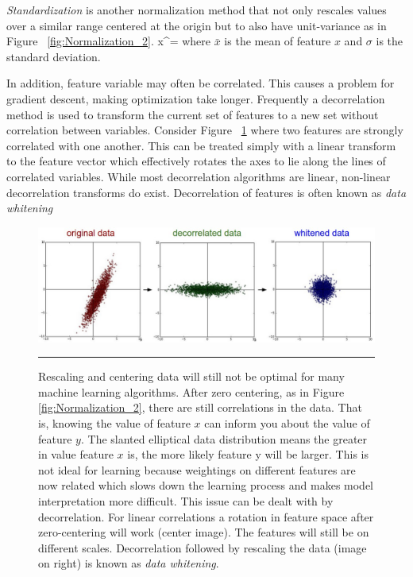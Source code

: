 \textit{Standardization} is another normalization method that not only rescales values over a similar range centered at the origin but to also have unit-variance as in Figure ~\ref{fig:Normalization_2}.
\be
x^\prime = 
\ee
where $\bar{x}$ is the mean of feature $x$ and $\sigma$ is the standard deviation.

In addition, feature variable may often be correlated.
This causes a problem for gradient descent, making optimization take longer\citep{featureScaling}.
Frequently a decorrelation method is used to transform the current set of features to a new set without correlation between variables.
Consider Figure ~\ref{fig:Normalization_3} where two features are strongly correlated with one another.
This can be treated simply with a linear transform to the feature vector which effectively rotates the axes to lie along the lines of correlated variables.
While most decorrelation algorithms are linear, non-linear decorrelation transforms do exist.
Decorrelation of features is often known as \textit{data whitening}
\begin{figure}[htbp]
	\centering
		\includegraphics[width = 1.0\textwidth]{./Figures/normalization_2_prepro2.jpeg}
		\rule{35em}{0.5pt}
	\caption[Decorrelation]{Rescaling and centering data will still not be optimal for many machine learning algorithms. After zero centering, as in Figure \protect\ref{fig:Normalization_2}, there are still correlations in the data. That is, knowing the value of feature $x$ can inform you about the value of feature $y$. The slanted elliptical data distribution means the greater in value feature $x$ is, the more likely feature y will be larger. This is not ideal for learning because weightings on different features are now related which slows down the learning process and makes model interpretation more difficult. This issue can be dealt with by decorrelation. For linear correlations a rotation in feature space after zero-centering will work (center image). The features will still be on different scales. Decorrelation followed by rescaling the data (image on right) is known as \textit{data whitening}.}
	\label{fig:Normalization_3}
\end{figure}

